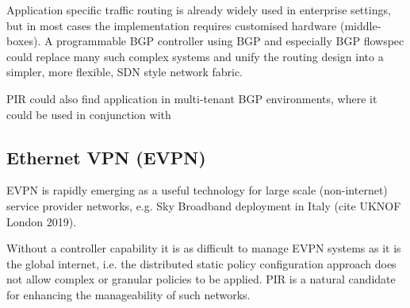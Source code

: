 Application specific traffic routing is already widely used in enterprise settings, but in most cases the implementation requires customised hardware (middle-boxes). A programmable BGP controller using BGP and especially BGP flowspec could replace many such complex systems and unify the routing design into a simpler, more flexible, SDN style network fabric.

PIR could also find application in multi-tenant BGP environments, where it could be used in conjunction with

\subsection{Ethernet VPN (EVPN)}

EVPN is rapidly emerging as a useful technology for large scale (non-internet) service provider networks, e.g. Sky Broadband deployment in Italy (cite UKNOF London 2019).

Without a controller capability it is as difficult to manage EVPN systems as it is the global internet, i.e. the distributed static policy configuration approach does not allow complex or granular policies to be applied. PIR is a natural candidate for enhancing the manageability of such networks.
